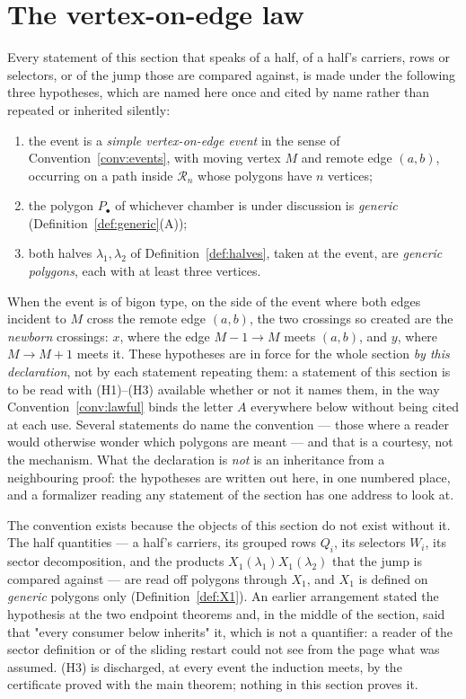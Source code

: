 \section{The vertex-on-edge law}\label{sec:s7}

\begin{convention}
\label{conv:s7standing}
Every statement of this section that speaks of a half, of a half's carriers,
rows or selectors, or of the jump those are compared against, is made under the
following three hypotheses, which are named here once and cited by name rather
than repeated or inherited silently:
\begin{enumerate}
\item[(H1)] the event is a \emph{simple vertex-on-edge event} in the sense of
Convention~\ref{conv:events}, with moving vertex $M$ and remote edge $(a,b)$,
occurring on a path inside $\mathcal R_n$ whose polygons have $n$ vertices;
\item[(H2)] the polygon $P_\bullet$ of whichever chamber is under discussion is
\emph{generic} (Definition~\ref{def:generic}(A));
\item[(H3)] both halves $\lambda_1,\lambda_2$ of Definition~\ref{def:halves},
taken at the event, are \emph{generic polygons}, each with at least three
vertices.
\end{enumerate}
When the event is of bigon type, on the side of the event where both edges
incident to $M$ cross the remote edge $(a,b)$, the two crossings so created are
the \emph{newborn} crossings: $x$, where the edge $M-1\to M$ meets $(a,b)$,
and $y$, where $M\to M+1$ meets it.
These hypotheses are in force for the whole section \emph{by this declaration},
not by each statement repeating them: a statement of this section is to be read
with (H1)--(H3) available whether or not it names them, in the way
Convention~\ref{conv:lawful} binds the letter $A$ everywhere below without
being cited at each use. Several statements do name the convention --- those
where a reader would otherwise wonder which polygons are meant --- and that is
a courtesy, not the mechanism. What the declaration is \emph{not} is an
inheritance from a neighbouring proof: the hypotheses are written out here, in
one numbered place, and a formalizer reading any statement of the section has
one address to look at.

The convention exists because the objects of this section do not exist without
it. The half quantities --- a half's carriers, its grouped rows $Q_i$, its
selectors $W_i$, its sector decomposition, and the products
$X_1(\lambda_1)X_1(\lambda_2)$ that the jump is compared against --- are read
off polygons through $X_1$, and $X_1$ is defined on \emph{generic} polygons
only (Definition~\ref{def:X1}). An earlier arrangement stated the hypothesis at
the two endpoint theorems and, in the middle of the section, said that "every
consumer below inherits" it, which is not a quantifier: a reader of the sector
definition or of the sliding restart could not see from the page what was
assumed. (H3) is discharged, at every event the induction meets, by the
certificate proved with the main theorem; nothing in this section proves it.
\end{convention}

